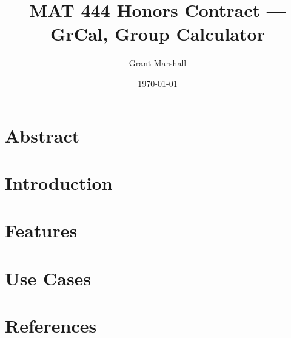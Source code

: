 \documentclass[a4paper]{article}
\title{MAT 444 Honors Contract --- GrCal, Group Calculator}
\author{Grant Marshall}
\date{\today}
\theoremstyle{definition}
\begin{document}
\maketitle

\section{Abstract}

\section{Introduction}

\section{Features}

\section{Use Cases}

\section{References}
\end{document}
